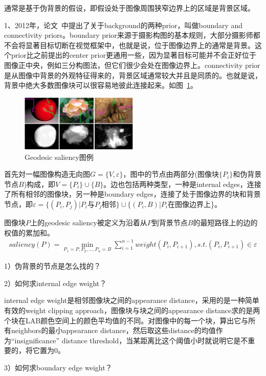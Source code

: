 \documentclass[12pt]{article}
\begin{document}
通常是基于伪背景的假设，即假设处于图像周围狭窄边界上的区域是背景区域。

1、2012年，论文~\cite{wei2012geodesic}中提出了关于background的两种prior，叫做boundary and connectivity priors。boundary prior来源于摄影构图的基本规则，大部分摄影师都不会将显著目标切断在视觉框架中，也就是说，位于图像边界上的通常是背景。这个prior比之前提出的center prior更通用一些，因为显著目标可能并不会正好位于图像正中央，例如三分构图法，但它们很少会处在图像边界上。connectivity prior是从图像中背景的外观特征得来的，背景区域通常较大并且是同质的。也就是说，背景中绝大多数图像块可以很容易地彼此连接起来。如图~\ref{fig: GS}。
\begin{figure}[!ht]
\centering
\includegraphics[width=0.5\textwidth]{GS.png}
\caption{Geodesic saliency图例}
\label{fig: GS}
\end{figure} 

首先対一幅图像构造无向图$G = \{V, \varepsilon \}$，图中的节点由两部分(图像块$\{P_i\}$和伪背景节点$B$)构成，即$V = \{P_i\}\cup \{B\}$。边也包括两种类型，一种是internal edges，连接了所有相邻的图像块，另一种是boundary edges，连接了处于图像边界的块和背景节点，即$\varepsilon = \{(P_i, P_j)|$$P_i$与$P_j$相邻$\} \cup \{(P_i, B)|$$P_i$在图像边界上\}。

图像块$P$上的geodesic saliency被定义为沿着从$P$到背景节点$B$的最短路径上的边的权值的累加和。
\begin{align}
saliency(P) = \min_{P_1=P, P_2, \ldots, P_n=B}\sum_{i=1}^{n-1}weight(P_i, P_{i+1}), s.t.(P_i, P_{i+1})\in \varepsilon
\end{align}

1）伪背景的节点是怎么找的？

2）如何求internal edge weight？

internal edge weight是相邻图像块之间的appearance distance，采用的是一种简单有效的weight clipping approach，图像块与块之间的appearance distance求的是两个块在LAB颜色空间上的颜色平均值的不同。对图像中的每一个块，算出它与所有neighbors的最小appearance distance，然后取这些distance的均值作为“insignificance” distance threshold，当某距离比这个阈值小时就说明它是不重要的，将它置为0。

3）如何求boundary edge weight？
\end{document}
